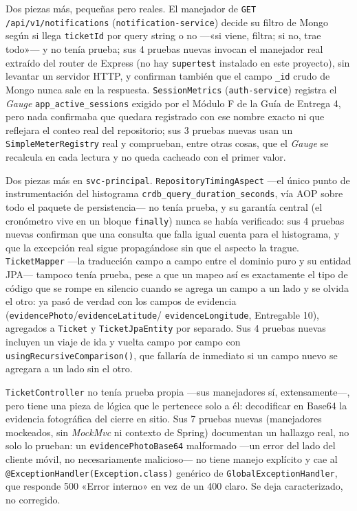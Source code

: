 Dos piezas más, pequeñas pero reales. El manejador de \texttt{GET /api/v1/notifications}
(\texttt{notification-service}) decide su filtro de Mongo según si llega \texttt{ticketId} por
query string o no —«si viene, filtra; si no, trae todo»— y no tenía prueba; sus 4 pruebas nuevas
invocan el manejador real extraído del router de Express (no hay \texttt{supertest} instalado en
este proyecto), sin levantar un servidor HTTP, y confirman también que el campo \texttt{\_id}
crudo de Mongo nunca sale en la respuesta. \texttt{SessionMetrics} (\texttt{auth-service}) registra
el \emph{Gauge} \texttt{app\_active\_sessions} exigido por el Módulo F de la Guía de Entrega 4,
pero nada confirmaba que quedara registrado con ese nombre exacto ni que reflejara el conteo real
del repositorio; sus 3 pruebas nuevas usan un \texttt{SimpleMeterRegistry} real y comprueban,
entre otras cosas, que el \emph{Gauge} se recalcula en cada lectura y no queda cacheado con el
primer valor.

Dos piezas más en \texttt{svc-principal}. \texttt{RepositoryTimingAspect} —el único punto de
instrumentación del histograma \texttt{crdb\_query\_duration\_seconds}, vía AOP sobre todo el
paquete de persistencia— no tenía prueba, y su garantía central (el cronómetro vive en un bloque
\texttt{finally}) nunca se había verificado: sus 4 pruebas nuevas confirman que una consulta que
falla igual cuenta para el histograma, y que la excepción real sigue propagándose sin que el
aspecto la trague. \texttt{TicketMapper} —la traducción campo a campo entre el dominio puro y su
entidad JPA— tampoco tenía prueba, pese a que un mapeo así es exactamente el tipo de código que
se rompe en silencio cuando se agrega un campo a un lado y se olvida el otro: ya pasó de verdad
con los campos de evidencia (\texttt{evidencePhoto}/\texttt{evidenceLatitude}/%
\texttt{evidenceLongitude}, Entregable 10), agregados a \texttt{Ticket} y \texttt{TicketJpaEntity}
por separado. Sus 4 pruebas nuevas incluyen un viaje de ida y vuelta campo por campo con
\texttt{usingRecursiveComparison()}, que fallaría de inmediato si un campo nuevo se agregara a un
lado sin el otro.

\texttt{TicketController} no tenía prueba propia —sus manejadores sí, extensamente—, pero
tiene una pieza de lógica que le pertenece solo a él: decodificar en Base64 la evidencia
fotográfica del cierre en sitio. Sus 7 pruebas nuevas (manejadores mockeados, sin \emph{MockMvc}
ni contexto de Spring) documentan un hallazgo real, no solo lo prueban: un
\texttt{evidencePhotoBase64} malformado —un error del lado del cliente móvil, no
necesariamente malicioso— no tiene manejo explícito y cae al
\texttt{@ExceptionHandler(Exception.class)} genérico de \texttt{GlobalExceptionHandler}, que
responde 500 «Error interno» en vez de un 400 claro. Se deja caracterizado, no corregido.

